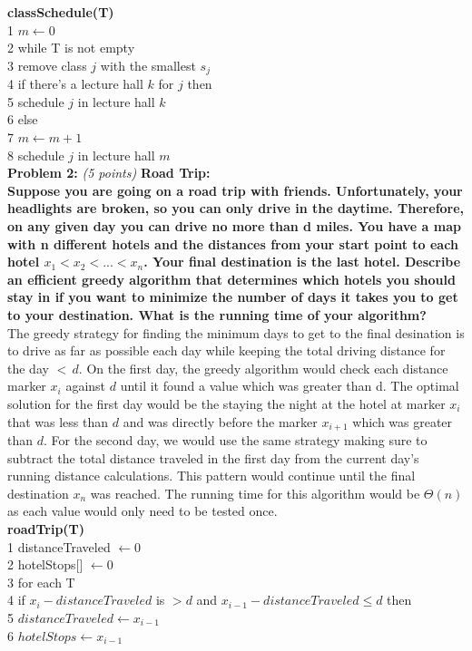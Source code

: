 \documentclass{article}
\begin{document}
\noindent \textbf{classSchedule(T)}\\
1 \quad $m \xleftarrow{} 0$\\
2 \quad while T is not empty\\
3 \qquad remove class $j$ with the smallest $s_j$\\
4 \qquad if there's a lecture hall $k$ for $j$ then \\
5 \qquad\qquad schedule $j$ in lecture hall $k$ \\
6 \qquad else\\
7 \qquad\qquad $m \xleftarrow{} m+1$\\
8 \qquad\qquad schedule $j$ in lecture hall $m$\\[.25cm]


\noindent \textbf{Problem 2:} \textit{(5 points)} \textbf{Road Trip:}\\

\noindent \textbf{Suppose you are going on a road trip with friends. Unfortunately, your headlights are broken, so you can only drive in the daytime. Therefore, on any given day you can drive no more than d miles. You have a map with n different hotels and the distances from your start point to each hotel $x_1< x_2< ... < x_{n}$. Your final destination is the last hotel. Describe an efficient greedy algorithm that determines which hotels you should stay in if you want to minimize the number of days it takes you to get to your destination. What is the running time of your algorithm?}
\\[.25cm]

The greedy strategy for finding the minimum days to get to the final desination is to drive as far as possible each day while keeping the total driving distance for the day $<\,d$.  On the first day, the greedy algorithm would check each distance marker $x_i$ against $d$ until it found a value which was greater than d. The optimal solution for the first day would be the staying the night at the hotel at marker $x_i$ that was less than $d$ and was directly before the marker  $x_{i+1}$ which was greater than $d$. For the second day, we would use the same strategy making sure to subtract the total distance traveled in the first day from the current day's running distance calculations. This pattern would continue until the final destination $x_n$ was reached. The running time for this algorithm would be $\Theta(n)$ as each value would only need to be tested once.\\[.25cm]

\noindent \textbf{roadTrip(T)}\\
1 \quad distanceTraveled $ \leftarrow 0$\\
2 \quad hotelStops[] $ \leftarrow 0$\\
3 \quad for each T \\
4 \qquad if $x_i - distanceTraveled$ is $> d$ and $x_{i-1} - distanceTraveled \leq d$ then\\
5 \qquad\qquad $distanceTraveled \leftarrow x_{i-1}$\\
6 \qquad\qquad $hotelStops \leftarrow x_{i-1}$\\[.25cm]
\end{document}
